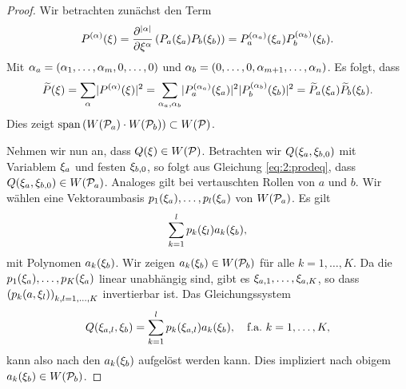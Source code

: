 \begin{proof}
Wir betrachten zunächst den Term
\begin{equation}
P^{(\alpha)}(\xi)
=\frac{\partial^{\lvert\alpha\rvert}}{\partial\xi^\alpha}\left(P_a(\xi_a)P_b(\xi_b)\right)
=P^{(\alpha_a)}_a(\xi_a)P^{(\alpha_b)}_b(\xi_b).
\end{equation}
Mit $\alpha_a=(\alpha_1,\dots,\alpha_m,0,\dots,0)$
und $\alpha_b=(0,\dots,0,\alpha_{m+1},\dots,\alpha_n)$.
Es folgt, dass
\begin{equation}\label{eq:2:prodeq}
\widetilde{P}(\xi)=\sum_\alpha\lvert P^{(\alpha)}(\xi)\rvert^2
=\sum_{\alpha_a,\alpha_b}\lvert P^{(\alpha_a)}_a(\xi_a)\rvert^2\lvert P^{(\alpha_b)}_b(\xi_b)\rvert^2
=\widetilde{P}_a(\xi_a)\widetilde{P}_b(\xi_b).
\end{equation}
Dies zeigt $\operatorname{span}\left(W(\mathcal P_a)\cdot W(\mathcal P_b)\right)\subset W(\mathcal P)$.

Nehmen wir nun an, dass $Q(\xi)\in W(\mathcal P)$.
Betrachten wir $Q(\xi_a,\xi_{b,0})$ mit Variablem $\xi_a$ und festen $\xi_{b,0}$,
so folgt aus Gleichung \eqref{eq:2:prodeq},
dass $Q(\xi_a,\xi_{b,0})\in W(\mathcal P_a)$.
Analoges gilt bei vertauschten Rollen von $a$ und $b$.
Wir wählen eine Vektoraumbasis $p_1(\xi_a),\dots,p_l(\xi_a)$ von $W(\mathcal P_a)$.
Es gilt
\begin{equation}
\sum_{k=1}^lp_k(\xi_l)a_k(\xi_b),
\end{equation}
mit Polynomen $a_k(\xi_b)$.
Wir zeigen $a_k(\xi_b)\in W(\mathcal P_b)$ für alle $k=1,\dots,K$.
Da die $p_1(\xi_a),\dots,p_K(\xi_a)$ linear unabhängig sind,
gibt es $\xi_{a,1},\dots,\xi_{a,K}$,
so dass $\left(p_k(a,\xi_l)\right)_{k,l=1,\dots,K}$ invertierbar ist.
Das Gleichungssystem
\begin{equation}
Q(\xi_{a,l},\xi_b)=\sum_{k=1}^lp_k(\xi_{a,l})a_k(\xi_b),\quad\text{f.a.}~k=1,\dots,K,
\end{equation}
kann also nach den $a_k(\xi_b)$ aufgelöst werden kann.
Dies impliziert nach obigem $a_k(\xi_b)\in W(\mathcal P_b)$.

\end{proof}

